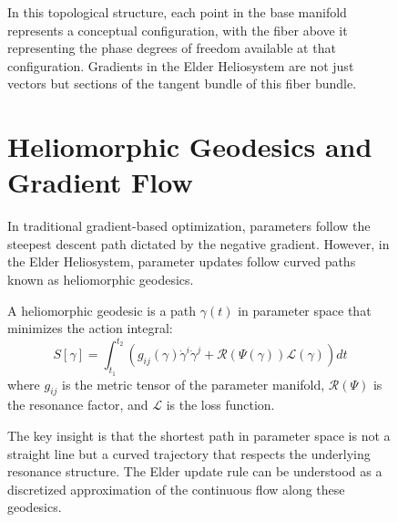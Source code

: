 \begin{figure}[ht]
In this topological structure, each point in the base manifold represents a conceptual configuration, with the fiber above it representing the phase degrees of freedom available at that configuration. Gradients in the Elder Heliosystem are not just vectors but sections of the tangent bundle of this fiber bundle.

\section{Heliomorphic Geodesics and Gradient Flow}

In traditional gradient-based optimization, parameters follow the steepest descent path dictated by the negative gradient. However, in the Elder Heliosystem, parameter updates follow curved paths known as heliomorphic geodesics.

\begin{definition}
A heliomorphic geodesic is a path $\gamma(t)$ in parameter space that minimizes the action integral:
\begin{equation}
S[\gamma] = \int_{t_1}^{t_2} \left( g_{ij}(\gamma) \dot{\gamma}^i \dot{\gamma}^j + \mathcal{R}(\Psi(\gamma)) \mathcal{L}(\gamma) \right) dt
\end{equation}
where $g_{ij}$ is the metric tensor of the parameter manifold, $\mathcal{R}(\Psi)$ is the resonance factor, and $\mathcal{L}$ is the loss function.
\end{definition}

The key insight is that the shortest path in parameter space is not a straight line but a curved trajectory that respects the underlying resonance structure. The Elder update rule can be understood as a discretized approximation of the continuous flow along these geodesics.

\begin{figure}[ht]
\centering
{}
\end{figure}
\end{figure}

